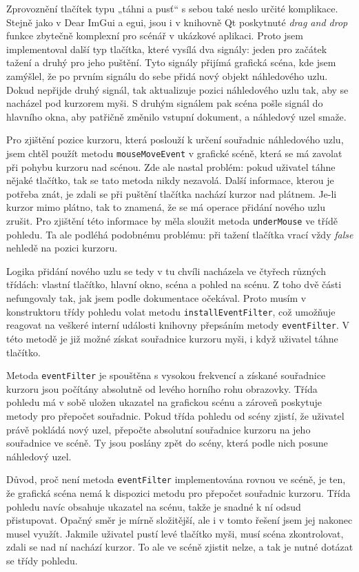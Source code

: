 \documentclass[FM,DP]{tulthesis}
\begin{document}
	Zprovoznění tlačítek typu „táhni a pusť“ s sebou také neslo určité komplikace. Stejně jako v Dear ImGui a egui, jsou i v knihovně Qt poskytnuté \textit{drag and drop} funkce zbytečně komplexní pro scénář v ukázkové aplikaci. Proto jsem implementoval další typ tlačítka, které vysílá dva signály: jeden pro začátek tažení a druhý pro jeho puštění. Tyto signály přijímá grafická scéna, kde jsem zamýšlel, že po prvním signálu do sebe přidá nový objekt náhledového uzlu. Dokud nepřijde druhý signál, tak aktualizuje pozici náhledového uzlu tak, aby se nacházel pod kurzorem myši. S druhým signálem pak scéna pošle signál do hlavního okna, aby patřičně změnilo vstupní dokument, a náhledový uzel smaže.
	
	Pro zjištění pozice kurzoru, která poslouží k určení souřadnic náhledového uzlu, jsem chtěl použít metodu \texttt{mouseMoveEvent} v grafické scéně, která se má zavolat při pohybu kurzoru nad scénou. Zde ale nastal problém: pokud uživatel táhne nějaké tlačítko, tak se tato metoda nikdy nezavolá. Další informace, kterou je potřeba znát, je zdali se při puštění tlačítka nachází kurzor nad plátnem. Je-li kurzor mimo plátno, tak to znamená, že se má operace přidání nového uzlu zrušit. Pro zjištění této informace by měla sloužit metoda \texttt{underMouse} ve třídě pohledu. Ta ale podléhá podobnému problému: při tažení tlačítka vrací vždy \textit{false} nehledě na pozici kurzoru.
	
	Logika přidání nového uzlu se tedy v tu chvíli nacházela ve čtyřech různých třídách: vlastní tlačítko, hlavní okno, scéna a pohled na scénu. Z toho dvě části nefungovaly tak, jak jsem podle dokumentace očekával. Proto musím v konstruktoru třídy pohledu volat metodu \texttt{installEventFilter}, což umožňuje reagovat na veškeré interní události knihovny přepsáním metody \texttt{eventFilter}. V této metodě je již možné získat souřadnice kurzoru myši, i když uživatel táhne tlačítko.
	
	Metoda \texttt{eventFilter} je spouštěna s vysokou frekvencí a získané souřadnice kurzoru jsou počítány absolutně od levého horního rohu obrazovky. Třída pohledu má v sobě uložen ukazatel na grafickou scénu a zároveň poskytuje metody pro přepočet souřadnic. Pokud třída pohledu od scény zjistí, že uživatel právě pokládá nový uzel, přepočte absolutní souřadnice kurzoru na jeho souřadnice ve scéně. Ty jsou poslány zpět do scény, která podle nich posune náhledový uzel.
	
	Důvod, proč není metoda \texttt{eventFilter} implementována rovnou ve scéně, je ten, že grafická scéna nemá k dispozici metodu pro přepočet souřadnic kurzoru. Třída pohledu navíc obsahuje ukazatel na scénu, takže je snadné k ní odsud přistupovat. Opačný směr je mírně složitější, ale i v tomto řešení jsem jej nakonec musel využít. Jakmile uživatel pustí levé tlačítko myši, musí scéna zkontrolovat, zdali se nad ní nachází kurzor. To ale ve scéně zjistit nelze, a tak je nutné dotázat se třídy pohledu.
	
\end{document}
